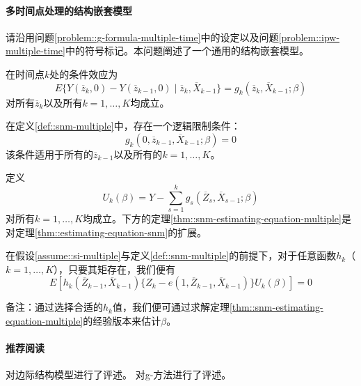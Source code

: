   
   \paragraph{多时间点处理的结构嵌套模型}\label{problem::snm-multiple-time}


请沿用问题\ref{problem::g-formula-multiple-time}中的设定以及问题\ref{problem::ipw-multiple-time}中的符号标记。本问题阐述了一个通用的结构嵌套模型。 

\begin{definition}
[具有多个时间点的结构嵌套模型]
\label{def::snm-multiple}
在时间点$k$处的条件效应为
$$
E\{  Y(\overline{z}_k,0) - Y( \overline{z}_{k-1},0) \mid \overline{z}_k , \overline{X}_{k-1} \} = g_k( \overline{z}_k, \overline{X}_{k-1}; \beta) 
$$
对所有$\overline{z}_k$以及所有$k=1,\ldots, K$均成立。 
\end{definition}


 
在定义\ref{def::snm-multiple}中，存在一个逻辑限制条件：
$$
g_k(0,  \overline{z}_{k-1}, \overline{X}_{k-1}; \beta)    = 0
$$
该条件适用于所有的$\overline{z}_{k-1}$以及所有的$k=1,\ldots, K$。 


定义
$$
U_k(\beta) = Y - \sum_{s=1}^k  g_s( \overline{Z}_s, \overline{X}_{s-1}; \beta) 
$$
对所有$k=1,\ldots, K$均成立。下方的定理\ref{thm::snm-estimating-equation-multiple}是对定理\ref{thm::estimating-equation-snm}的扩展。



\begin{theorem}
\label{thm::snm-estimating-equation-multiple}
在假设\ref{assume::si-multiple}与定义\ref{def::snm-multiple}的前提下，对于任意函数$h_k$（$k=1,\ldots, K$），只要其矩存在，我们便有
$$
E\left[    h_k( \overline{Z}_{k-1}, \overline{X}_{k-1} ) \{  Z_k - e(1, \overline{Z}_{k-1}, \overline{X}_{k-1}) \}  U_k(\beta) 
\right] = 0
$$ 
\end{theorem}



备注：通过选择合适的$h_k$值，我们便可通过求解定理\ref{thm::snm-estimating-equation-multiple}的经验版本来估计$\beta$。 


  
  \paragraph{推荐阅读} 

\citet{robins2000marginal} 对边际结构模型进行了评述。\citet{naimi2017introduction} 对g-方法进行了评述。  
